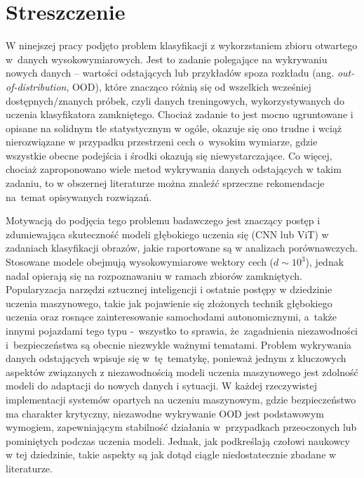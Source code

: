 
\chapter*{Streszczenie}
\label{chapter:streszczenie}

W ninejszej pracy podjęto problem klasyfikacji z wykorzstaniem zbioru otwartego w~danych wysokowymiarowych. Jest to zadanie polegające na wykrywaniu nowych danych – wartości odstających lub przykładów spoza rozkładu (ang. \textit{out-of-distribution}, OOD), które znacząco różnią się od wszelkich wcześniej dostępnych/znanych próbek, czyli danych treningowych, wykorzystywanych do uczenia klasyfikatora zamkniętego. Chociaż zadanie to jest mocno ugruntowane i opisane na solidnym tle statystycznym w ogóle, okazuje się ono trudne i wciąż nierozwiązane w przypadku przestrzeni cech o~wysokim wymiarze, gdzie wszystkie obecne podejścia i środki okazują się niewystarczające. Co więcej, chociaż zaproponowano wiele metod wykrywania danych odstających w takim zadaniu, to w obszernej literaturze można znaleźć sprzeczne rekomendacje na~temat opisywanych rozwiązań.

Motywacją do podjęcia tego problemu badawczego jest znaczący postęp i zdumiewająca skuteczność modeli głębokiego uczenia się (CNN lub ViT) w zadaniach klasyfikacji obrazów, jakie raportowane są w analizach porównawczych. Stosowane modele obejmują wysokowymiarowe wektory cech ($d \sim 10^3$), jednak nadal opierają się na rozpoznawaniu w ramach zbiorów zamkniętych. Popularyzacja narzędzi sztucznej inteligencji i ostatnie postępy w dziedzinie uczenia maszynowego, takie jak pojawienie się złożonych technik głębokiego uczenia oraz rosnące zainteresowanie samochodami autonomicznymi, a~także innymi pojazdami tego typu -~wszystko to sprawia, że~zagadnienia niezawodności i~bezpieczeństwa są obecnie niezwykle ważnymi tematami. Problem wykrywania danych odstających wpisuje się w~tę~tematykę, ponieważ jednym z kluczowych aspektów związanych z niezawodnością modeli uczenia maszynowego jest zdolność modeli do adaptacji do nowych danych i sytuacji. W każdej rzeczywistej implementacji systemów opartych na uczeniu maszynowym, gdzie bezpieczeństwo ma charakter krytyczny, niezawodne wykrywanie OOD jest podstawowym wymogiem, zapewniającym stabilność działania w~przypadkach przeoczonych lub pominiętych podczas uczenia modeli. Jednak, jak podkreślają czołowi naukowcy w tej dziedzinie, takie aspekty są jak dotąd ciągle niedostatecznie zbadane w literaturze.

